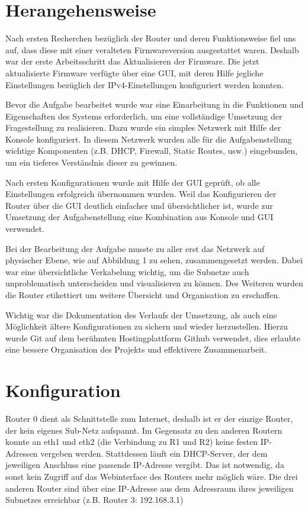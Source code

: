 \documentclass[10pt,a4paper]{article}
\begin{document}
\section{Herangehensweise}
Nach ersten Recherchen bezüglich der Router und deren Funktionsweise
fiel uns auf, dass diese mit einer veralteten Firmwareversion
ausgestattet waren. Deshalb war der erste Arbeitsschritt das
Aktualisieren der Firmware. Die jetzt aktualisierte Firmware verfügte
über eine GUI, mit deren Hilfe jegliche Einstellungen bezüglich der
IPv4-Einstellungen konfiguriert werden konnten.
\par
Bevor die Aufgabe bearbeitet wurde war eine Einarbeitung in die
Funktionen und Eigenschaften des Systems erforderlich, um eine
vollständige Umsetzung der Fragestellung zu realisieren. Dazu wurde
ein simples Netzwerk mit Hilfe der Konsole konfiguriert. In diesem
Netzwerk wurden alle für die Aufgabenstellung wichtige
Komponenten (z.B. DHCP, Firewall, Static Routes, usw.) eingebunden, um
ein tieferes Verständnis dieser zu gewinnen.
\par
Nach ersten Konfigurationen wurde mit Hilfe der GUI geprüft, ob alle
Einstellungen erfolgreich übernommen wurden. Weil das Konfigurieren
der Router über die GUI deutlich einfacher und übersichtlicher ist,
wurde zur Umsetzung der Aufgabenstellung eine Kombination aus Konsole
und GUI verwendet.
\par
Bei der Bearbeitung der Aufgabe musste zu aller erst das Netzwerk auf
physischer Ebene, wie auf Abbildung 1 zu sehen, zusammengesetzt
werden. Dabei war eine übersichtliche Verkabelung wichtig, um die
Subnetze auch unproblematisch unterscheiden und visualisieren zu
können. Des Weiteren wurden die Router etikettiert um weitere
Übersicht und Organisation zu erschaffen.
\par
Wichtig war die Dokumentation des Verlaufs der Umsetzung, als auch
eine Möglichkeit ältere Konfigurationen zu sichern und wieder
herzustellen. Hierzu wurde Git auf dem berühmten Hostingplattform
Github verwendet, dies erlaubte eine bessere Organisation des Projekts
und effektivere Zusammenarbeit.


\section{Konfiguration}
	Router 0 dient als Schnittstelle zum Internet, deshalb ist er der einzige Router, der kein eigenes Sub-Netz aufspannt. Im Gegensatz zu den anderen Routern konnte an eth1 und eth2 (die Verbindung zu R1 und R2) keine festen IP-Adressen vergeben werden. Stattdessen läuft ein DHCP-Server, der dem jeweiligen Anschluss eine passende IP-Adresse vergibt. Das ist notwendig, da sonst kein Zugriff auf das Webinterface des Routers mehr möglich wäre. Die drei anderen Router sind über eine IP-Adresse aus dem Adressraum ihres jeweiligen Subnetzes erreichbar (z.B. Router 3: 192.168.3.1) \par
	
\end{document}
